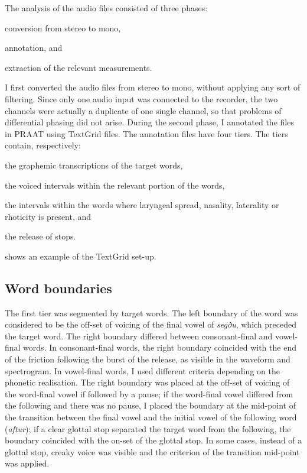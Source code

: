 \documentclass[11pt,a4paper,openany]{memoir}\usepackage[]{graphicx}\usepackage[]{color}
\begin{document}
The analysis of the audio files consisted of three phases:
\begin{inparaenum}[(1)]
	\item conversion from stereo to mono,
	\item annotation, and
	\item extraction of the relevant measurements.
\end{inparaenum}
I first converted the audio files from stereo to mono, without applying any sort of filtering.
Since only one audio input was connected to the recorder, the two channels were actually a duplicate of one single channel, so that problems of differential phasing did not arise.
During the second phase, I annotated the files in PRAAT \citep{boersma2015} using TextGrid files.
The annotation files have four tiers.
The tiers contain, respectively: 
\begin{inparaenum}[(1)]
	\item the graphemic transcriptions of the target words,
	\item the voiced intervals within the relevant portion of the words, 
	\item the intervals within the words where laryngeal spread, nasality, laterality or rhoticity is present, and
	\item the release of stops.
\end{inparaenum}
 shows an example of the TextGrid set-up.

\subsection{Word boundaries}

The first tier was segmented by target words.
The left boundary of the word was considered to be the off-set of voicing of the final vowel of \textit{segðu}, which preceded the target word.
The right boundary differed between consonant-final and vowel-final words.
In consonant-final words, the right boundary coincided with the end of the friction following the burst of the release, as visible in the waveform and spectrogram.
In vowel-final words, I used different criteria depending on the phonetic realisation.
The right boundary was placed at the off-set of voicing of the word-final vowel if followed by a pause; if the word-final vowel differed from the following and there was no pause, I placed the boundary at the mid-point of the transition between the final vowel and the initial vowel of the following word (\textit{aftur}); if a clear glottal stop separated the target word from the following, the boundary coincided with the on-set of the glottal stop.
In some cases, instead of a glottal stop, creaky voice was visible and the criterion of the transition mid-point was applied.
\end{document}
